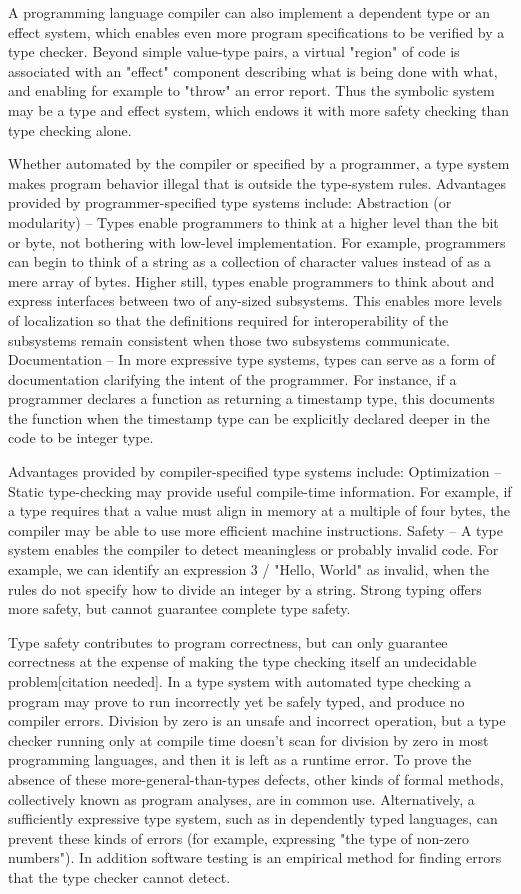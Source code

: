 \documentclass[12pt,b5paper]{book}
\theoremstyle{definition}
\begin{document}
A programming language compiler can also implement a dependent type or an effect system, which enables even more program specifications to be verified by a type checker. Beyond simple value-type pairs, a virtual "region" of code is associated with an "effect" component describing what is being done with what, and enabling for example to "throw" an error report. Thus the symbolic system may be a type and effect system, which endows it with more safety checking than type checking alone.

Whether automated by the compiler or specified by a programmer, a type system makes program behavior illegal that is outside the type-system rules. Advantages provided by programmer-specified type systems include:
Abstraction (or modularity) – Types enable programmers to think at a higher level than the bit or byte, not bothering with low-level implementation. For example, programmers can begin to think of a string as a collection of character values instead of as a mere array of bytes. Higher still, types enable programmers to think about and express interfaces between two of any-sized subsystems. This enables more levels of localization so that the definitions required for interoperability of the subsystems remain consistent when those two subsystems communicate.
Documentation – In more expressive type systems, types can serve as a form of documentation clarifying the intent of the programmer. For instance, if a programmer declares a function as returning a timestamp type, this documents the function when the timestamp type can be explicitly declared deeper in the code to be integer type.

Advantages provided by compiler-specified type systems include:
Optimization – Static type-checking may provide useful compile-time information. For example, if a type requires that a value must align in memory at a multiple of four bytes, the compiler may be able to use more efficient machine instructions.
Safety – A type system enables the compiler to detect meaningless or probably invalid code. For example, we can identify an expression 3 / "Hello, World" as invalid, when the rules do not specify how to divide an integer by a string. Strong typing offers more safety, but cannot guarantee complete type safety.

Type safety contributes to program correctness, but can only guarantee correctness at the expense of making the type checking itself an undecidable problem[citation needed]. In a type system with automated type checking a program may prove to run incorrectly yet be safely typed, and produce no compiler errors. Division by zero is an unsafe and incorrect operation, but a type checker running only at compile time doesn't scan for division by zero in most programming languages, and then it is left as a runtime error. To prove the absence of these more-general-than-types defects, other kinds of formal methods, collectively known as program analyses, are in common use. Alternatively, a sufficiently expressive type system, such as in dependently typed languages, can prevent these kinds of errors (for example, expressing "the type of non-zero numbers"). In addition software testing is an empirical method for finding errors that the type checker cannot detect.
\end{document}
